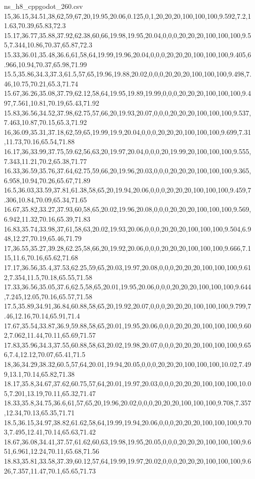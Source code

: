 \begin{filecontents*}[overwrite]{ns_h8_cppgodot_260.csv}
15,36.15,34.51,38,62,59,67,20,19.95,20.06,0.125,0,1,20,20,20,100,100,100,9.592,7.2,11.63,70.39,65.83,72.3
15.17,36.77,35.88,37.92,62.38,60,66,19.98,19.95,20.04,0,0,0,20,20,20,100,100,100,9.55,7.344,10.86,70.37,65.87,72.3
15.33,36.01,35.48,36.6,61,58,64,19.99,19.96,20.04,0,0,0,20,20,20,100,100,100,9.405,6.966,10.94,70.37,65.98,71.99
15.5,35.86,34.3,37.3,61.5,57,65,19.96,19.88,20.02,0,0,0,20,20,20,100,100,100,9.498,7.46,10.75,70.21,65.3,71.74
15.67,36.26,35.08,37.79,62.12,58,64,19.95,19.89,19.99,0,0,0,20,20,20,100,100,100,9.497,7.561,10.81,70.19,65.43,71.92
15.83,36.56,34.52,37.98,62.75,57,66,20,19.93,20.07,0,0,0,20,20,20,100,100,100,9.537,7.463,10.87,70.15,65.3,71.92
16,36.09,35.31,37.18,62,59,65,19.99,19.9,20.04,0,0,0,20,20,20,100,100,100,9.699,7.31,11.73,70.16,65.54,71.88
16.17,36,33.99,37.75,59.62,56,63,20,19.97,20.04,0,0,0,20,19.99,20,100,100,100,9.555,7.343,11.21,70.2,65.38,71.77
16.33,36.59,35.76,37.64,62.75,59,66,20,19.96,20.03,0,0,0,20,20,20,100,100,100,9.365,6.958,10.94,70.26,65.67,71.89
16.5,36.03,33.59,37.81,61.38,58,65,20,19.94,20.06,0,0,0,20,20,20,100,100,100,9.459,7.306,10.84,70.09,65.34,71.65
16.67,35.82,33.27,37.93,60,58,65,20.02,19.96,20.08,0,0,0,20,20,20,100,100,100,9.569,6.942,11.32,70.16,65.39,71.83
16.83,35.74,33.98,37,61,58,63,20.02,19.93,20.06,0,0,0,20,20,20,100,100,100,9.504,6.948,12.27,70.19,65.46,71.79
17,36.55,35.27,39.28,62.25,58,66,20,19.92,20.06,0,0,0,20,20,20,100,100,100,9.666,7.115,11.6,70.16,65.62,71.68
17.17,36.56,35.4,37.53,62.25,59,65,20.03,19.97,20.08,0,0,0,20,20,20,100,100,100,9.612,7.354,11.5,70.18,65.55,71.58
17.33,36.56,35.05,37.6,62.5,58,65,20.01,19.95,20.06,0,0,0,20,20,20,100,100,100,9.644,7.245,12.05,70.16,65.57,71.58
17.5,35.89,34.91,36.84,60.88,58,65,20,19.92,20.07,0,0,0,20,20,20,100,100,100,9.799,7.46,12.16,70.14,65.91,71.4
17.67,35.54,33.87,36.9,59.88,58,65,20.01,19.95,20.06,0,0,0,20,20,20,100,100,100,9.602,7.062,11.44,70.11,65.69,71.57
17.83,35.96,34.3,37.55,60.88,58,63,20.02,19.98,20.07,0,0,0,20,20,20,100,100,100,9.656,7.4,12.12,70.07,65.41,71.5
18,36,34.29,38.32,60.5,57,64,20.01,19.94,20.05,0,0,0,20,20,20,100,100,100,10.02,7.499,13.1,70.14,65.82,71.38
18.17,35.8,34.67,37.62,60.75,57,64,20.01,19.97,20.03,0,0,0,20,20,20,100,100,100,10.05,7.201,13.19,70.11,65.32,71.47
18.33,35.8,34.75,36.6,61,57,65,20,19.96,20.02,0,0,0,20,20,20,100,100,100,9.708,7.357,12.34,70.13,65.35,71.71
18.5,36.15,34.97,38.82,61.62,58,64,19.99,19.94,20.06,0,0,0,20,20,20,100,100,100,9.703,7.495,12.41,70.14,65.63,71.42
18.67,36.08,34.41,37.57,61.62,60,63,19.98,19.95,20.05,0,0,0,20,20,20,100,100,100,9.651,6.961,12.24,70.11,65.68,71.56
18.83,35.81,33.58,37.39,60.12,57,64,19.99,19.97,20.02,0,0,0,20,20,20,100,100,100,9.626,7.357,11.47,70.1,65.65,71.73

\end{filecontents*}
